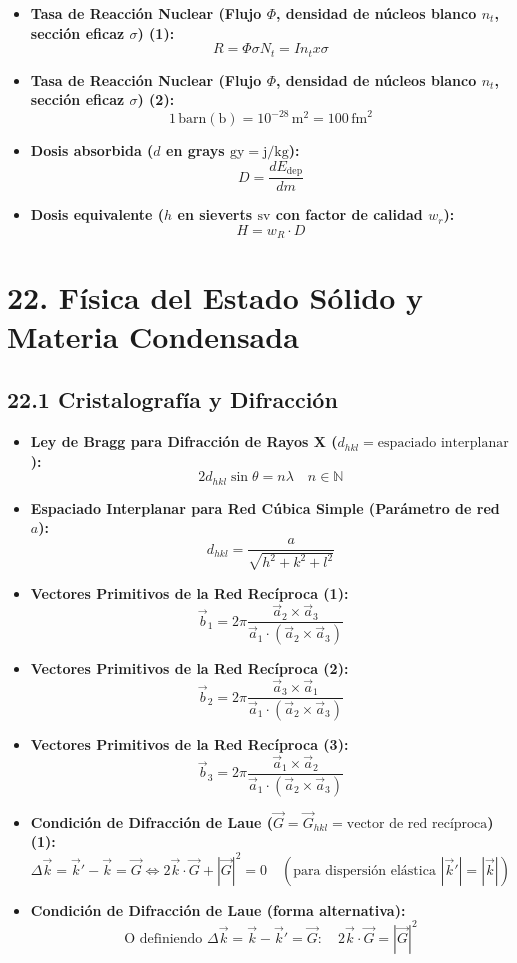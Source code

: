 \documentclass[11pt,a4paper]{article}
\begin{document}
\begin{itemize}
  \item \textbf{Tasa de Reacción Nuclear (Flujo $\Phi$, densidad de núcleos blanco $n_t$, sección eficaz $\sigma$) (1):}
  \[
    R = \Phi \sigma N_t = I n_t x \sigma
  \]
  \item \textbf{Tasa de Reacción Nuclear (Flujo $\Phi$, densidad de núcleos blanco $n_t$, sección eficaz $\sigma$) (2):}
  \[
    1 \, \text{barn} (\mathrm{b}) = 10^{-28} \, \mathrm{m}^2 = 100 \, \mathrm{fm}^2
  \]
  \item \textbf{Dosis absorbida ($d$ en grays $\mathrm{gy} = \mathrm{j/kg}$):}
  \[
    D = \frac{dE_{\mathrm{dep}}}{dm}
  \]
  \item \textbf{Dosis equivalente ($h$ en sieverts $\mathrm{sv}$ con factor de calidad $w_r$):}
  \[
    H = w_R \cdot D
  \]
\end{itemize}

\section*{22. Física del Estado Sólido y Materia Condensada}

\subsection*{22.1 Cristalografía y Difracción}

\begin{itemize}
  \item \textbf{Ley de Bragg para Difracción de Rayos X ($d_{hkl} = \text{espaciado interplanar}$):}
  \[
    2 d_{hkl} \sin\theta = n \lambda \quad n \in \mathbb{N}
  \]
  \item \textbf{Espaciado Interplanar para Red Cúbica Simple (Parámetro de red $a$):}
  \[
    d_{hkl} = \frac{a}{\sqrt{h^2 + k^2 + l^2}}
  \]
  \item \textbf{Vectores Primitivos de la Red Recíproca (1):}
  \[
    \vec{b}_1 = 2\pi \frac{\vec{a}_2 \times \vec{a}_3}{\vec{a}_1 \cdot (\vec{a}_2 \times \vec{a}_3)}
  \]
  \item \textbf{Vectores Primitivos de la Red Recíproca (2):}
  \[
    \vec{b}_2 = 2\pi \frac{\vec{a}_3 \times \vec{a}_1}{\vec{a}_1 \cdot (\vec{a}_2 \times \vec{a}_3)}
  \]
  \item \textbf{Vectores Primitivos de la Red Recíproca (3):}
  \[
    \vec{b}_3 = 2\pi \frac{\vec{a}_1 \times \vec{a}_2}{\vec{a}_1 \cdot (\vec{a}_2 \times \vec{a}_3)}
  \]
  \item \textbf{Condición de Difracción de Laue ($\vec{G} = \vec{G}_{hkl} = \text{vector de red recíproca}$) (1):}
  \[
    \Delta\vec{k} = \vec{k}' - \vec{k} = \vec{G} \iff 2\vec{k} \cdot \vec{G} + |\vec{G}|^2 = 0 \quad (\text{para dispersión elástica } |\vec{k}'| = |\vec{k}|)
  \]
  \item \textbf{Condición de Difracción de Laue (forma alternativa):}
  \[
    \text{O definiendo } \Delta\vec{k} = \vec{k} - \vec{k}' = \vec{G}: \quad 2\vec{k} \cdot \vec{G} = |\vec{G}|^2
  \]
\end{itemize}
\end{document}
